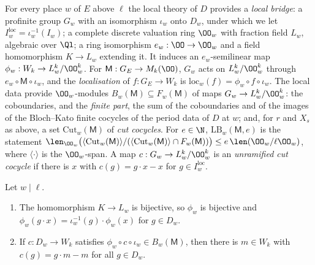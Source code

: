 \begin{definition}\label{pf:linkN:bridgedef}
For every place $w$ of $E$ above $\ell$ the local theory of $D$ provides a \emph{local bridge}: a profinite group $G_w$ with an isomorphism
$\iota_w$ onto $D_w$, under which we let $I^{\mathrm{loc}}_w=\iota_w^{-1}(I_w)$; a complete discrete valuation ring $\OO_w$ with fraction field $L_w$,
algebraic over $\Ql$; a ring isomorphism $e_w:\OO\to\OO_w$ and a field homomorphism $K\to L_w$ extending it. It induces an $e_w$-semilinear map
$\phi_w:W_k\to L_w^k/\OO_w^k$. For $\mathsf M:G_E\to M_k(\OO)$, $G_w$ acts on $L_w^k/\OO_w^k$ through $e_w\circ\mathsf M\circ\iota_w$, and the
\emph{localisation} of $f:G_E\to W_k$ is $\mathrm{loc}_w(f)=\phi_w\circ f\circ\iota_w$. The local data provide $\OO_w$-modules
$B_w(\mathsf M)\subseteq F_w(\mathsf M)$ of maps $G_w\to L_w^k/\OO_w^k$: the coboundaries, and the \emph{finite part}, the sum of the coboundaries and
of the images of the Bloch--Kato finite cocycles of the period data of $D$ at $w$; and, for $r$ and $X_s$ as above, a set
$\mathrm{Cut}_w(\mathsf M)$ of \emph{cut cocycles}. For $e\in\N$, $\mathrm{LB}_w(\mathsf M,e)$ is the statement
$\len_{\OO_w}\bigl(\langle\mathrm{Cut}_w(\mathsf M)\rangle/(\langle\mathrm{Cut}_w(\mathsf M)\rangle\cap F_w(\mathsf M))\bigr)\le e\,\len(\OO_w/\ell\OO_w)$,
where $\langle\cdot\rangle$ is the $\OO_w$-span. A map $c:G_w\to L_w^k/\OO_w^k$ is an \emph{unramified cut cocycle} if there is $x$ with
$c(g)=g\cdot x-x$ for $g\in I^{\mathrm{loc}}_w$.
\end{definition}

\begin{lemma}\label{pf:linkN:bridge}
Let $w\mid\ell$.
\begin{enumerate}[label=(\roman*)]
\item The homomorphism $K\to L_w$ is bijective, so $\phi_w$ is bijective and $\phi_w(g\cdot x)=\iota_w^{-1}(g)\cdot\phi_w(x)$ for
$g\in D_w$.
\item If $c:D_w\to W_k$ satisfies $\phi_w\circ c\circ\iota_w\in B_w(\mathsf M)$, then there is $m\in W_k$ with $c(g)=g\cdot m-m$ for all
$g\in D_w$.
\end{enumerate}
\end{lemma}

